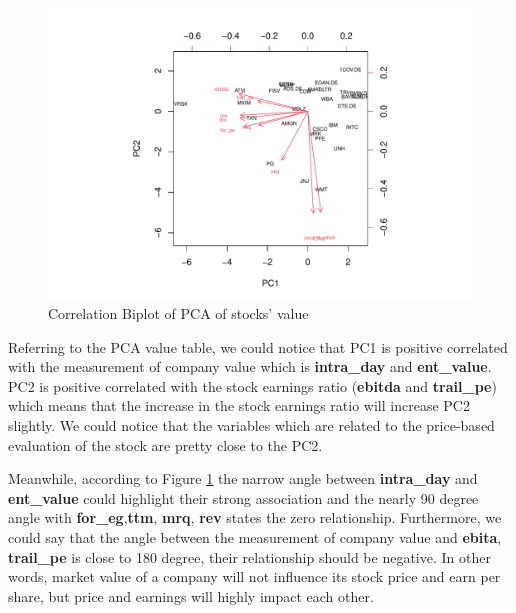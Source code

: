 \documentclass[11pt,a4paper,]{article}
\begin{document}
\begin{figure}
\centering
\includegraphics{ass2_files/figure-latex/pca-cor-1.pdf}
\caption{\label{fig:pca-cor}Correlation Biplot of PCA of stocks' value}
\end{figure}

Referring to the PCA value table, we could notice that PC1 is positive correlated with the measurement of company value which is \textbf{intra\_day} and \textbf{ent\_value}. PC2 is positive correlated with the stock earnings ratio (\textbf{ebitda} and \textbf{trail\_pe}) which means that the increase in the stock earnings ratio will increase PC2 slightly. We could notice that the variables which are related to the price-based evaluation of the stock are pretty close to the PC2.

Meanwhile, according to Figure \ref{fig:pca-cor} the narrow angle between \textbf{intra\_day} and \textbf{ent\_value} could highlight their strong association and the nearly 90 degree angle with \textbf{for\_eg},\textbf{ttm}, \textbf{mrq}, \textbf{rev} states the zero relationship. Furthermore, we could say that the angle between the measurement of company value and \textbf{ebita}, \textbf{trail\_pe} is close to 180 degree, their relationship should be negative. In other words, market value of a company will not influence its stock price and earn per share, but price and earnings will highly impact each other.
\end{document}
